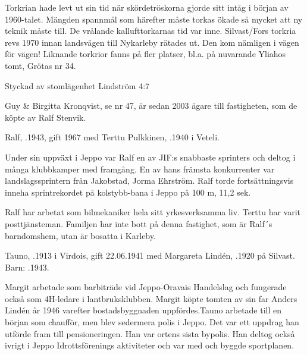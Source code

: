 Torkrian hade levt ut sin tid när skördetröskorna gjorde sitt intåg i början av 1960-talet. Mängden spannmål som härefter måste torkas ökade så mycket att ny teknik måste till. De vrålande kallufttorkarnas tid var inne.
Silvast/Fors torkria revs 1970 innan landsvägen till Nykarleby rätades ut. Den kom nämligen i vägen för vägen!
Liknande torkrior fanns på fler platser, bl.a.  på nuvarande Yliahos tomt, Grötas nr 34.


%

Styckad av stomlägenhet Lindström 4:7


%
Guy \& Birgitta Kronqvist, se nr 47, är sedan 2003 ägare till fastigheten, som de köpte av Ralf Stenvik.


%
Ralf, .1943, gift 1967 med Terttu Pulkkinen, .1940 i Veteli.
\begin{jhchildren}
  \item {}
  \item {}
\end{jhchildren}
Under sin uppväxt i Jeppo var Ralf en av JIF:s snabbaste sprinters och deltog i många klubbkamper med framgång. En av hans främsta konkurrenter var landslagssprintern från Jakobstad, Jorma Ehrström. Ralf torde fortsättningsvis inneha sprintrekordet på kolstybb-bana i Jeppo på 100 m, 11,2 sek.

Ralf har arbetat som bilmekaniker hela sitt yrkesverksamma liv. Terttu har varit posttjänsteman. Familjen har inte bott på denna fastighet, som är Ralf´s barndomshem, utan är bosatta i Karleby.


%
Tauno, .1913 i Virdois, gift 22.06.1941 med  Margareta Lindén, .1920 på Silvast.
Barn:  .1943.

Margit arbetade som barbiträde vid Jeppo-Oravais Handelslag och fungerade också som 4H-ledare i lantbruksklubben. Margit köpte tomten av sin far Anders Lindén år 1946 varefter bostadsbyggnaden uppfördes.Tauno arbetade till en början som chaufför, men blev sedermera polis i Jeppo. Det var ett uppdrag han utförde fram till pensioneringen. Han var ortens sista bypolis. Han deltog också ivrigt i Jeppo  Idrottsförenings aktiviteter och var med och byggde sportplanen.

